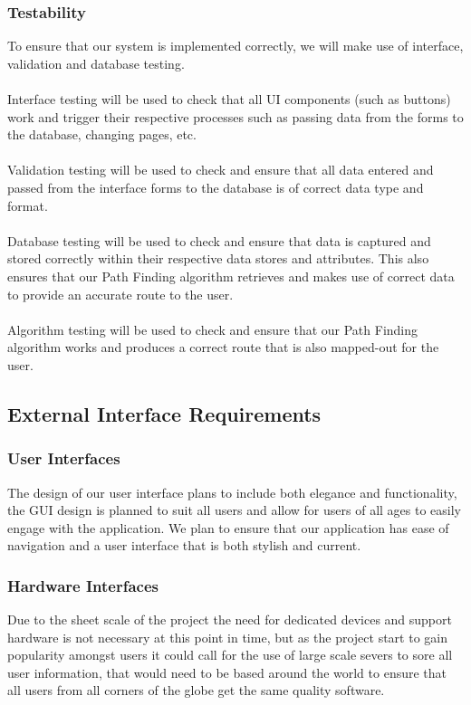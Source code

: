\documentclass[12pt]{article}
\begin{document}
\subsubsection{Testability}
To ensure that our system is implemented correctly, we will make use of interface, validation and database testing.\\\\
Interface testing will be used to check that all UI components (such as buttons) work and trigger their respective processes such as passing data from the forms to the database, changing pages, etc.\\\\
Validation testing will be used to check and ensure that all data entered and passed from the interface forms to the database is of correct data type and format.\\\\
Database testing will be used to check and ensure that data is captured and stored correctly within their respective data stores and attributes. This also ensures that our Path Finding algorithm retrieves and makes use of correct data to provide an accurate route to the user.\\\\
Algorithm testing will be used to check and ensure that our Path Finding algorithm works and produces a correct route that is also mapped-out for the user.


\subsection{External Interface Requirements}
\subsubsection{User Interfaces}
The design of our user interface plans to include both elegance and functionality, the GUI design is planned to suit all users and allow for users of all ages to easily engage with the application. We plan to ensure that our application has ease of navigation and a user interface that is both stylish and current.
\subsubsection{Hardware Interfaces}
Due to the sheet scale of the project the need for dedicated devices and support hardware is not necessary at this point in time, but as the project start to gain popularity amongst users it could call for the use of large scale severs to sore all user information, that would need to be based around the world to ensure that all users from all corners of the globe get the same quality software.
\end{document}
